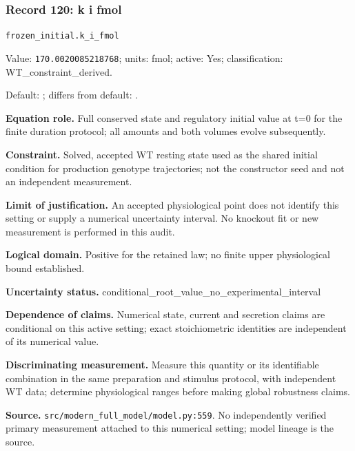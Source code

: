 \subsubsection*{Record 120: k i fmol}
{\small \nolinkurl{frozen_initial.k_i_fmol}\par

Value: \texttt{170.0020085218768}; units: fmol; active: Yes; classification: WT\_constraint\_derived.\par

Default: ; differs from default: .\par

\textbf{Equation role.} Full conserved state and regulatory initial value at t=0 for the finite duration protocol; all amounts and both volumes evolve subsequently.\par

\textbf{Constraint.} Solved, accepted WT resting state used as the shared initial condition for production genotype trajectories; not the constructor seed and not an independent measurement.\par

\textbf{Limit of justification.} An accepted physiological point does not identify this setting or supply a numerical uncertainty interval. No knockout fit or new measurement is performed in this audit.\par

\textbf{Logical domain.} Positive for the retained law; no finite upper physiological bound established.\par

\textbf{Uncertainty status.} conditional\_root\_value\_no\_experimental\_interval\par

\textbf{Dependence of claims.} Numerical state, current and secretion claims are conditional on this active setting; exact stoichiometric identities are independent of its numerical value.\par

\textbf{Discriminating measurement.} Measure this quantity or its identifiable combination in the same preparation and stimulus protocol, with independent WT data; determine physiological ranges before making global robustness claims.\par

\textbf{Source.} \nolinkurl{src/modern_full_model/model.py:559}. No independently verified primary measurement attached to this numerical setting; model lineage is the source.\par}


